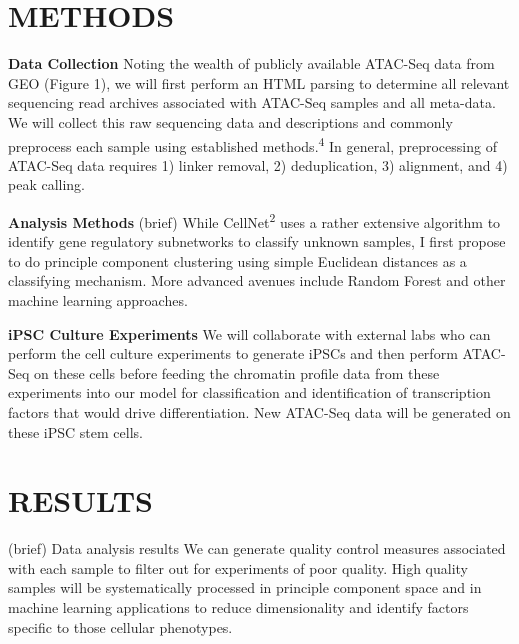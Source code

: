 \documentclass[12pt]{article}
\begin{document}
 \section{\textbf{{\Large M}{\small ETHODS}}}
 
\textbf{Data Collection} \newline
 Noting the wealth of publicly available ATAC-Seq data from GEO (Figure 1), we will first perform an HTML parsing to determine all relevant sequencing read archives associated with ATAC-Seq samples and all meta-data. We will collect this raw sequencing data and descriptions and commonly preprocess each sample using established methods.\textsuperscript{4} In general, preprocessing of ATAC-Seq data requires 1) linker removal, 2) deduplication, 3) alignment, and 4) peak calling.  \newline

\textbf{Analysis Methods} \newline
(brief) While CellNet\textsuperscript{2} uses a rather extensive algorithm to identify gene regulatory subnetworks to classify unknown samples, I first propose to do principle component clustering using simple Euclidean distances as a classifying mechanism. More advanced avenues include Random Forest and other machine learning approaches. \newline 

\textbf{iPSC Culture Experiments} \newline
We will collaborate with external labs who can perform the cell culture experiments to generate iPSCs and then perform ATAC-Seq on these cells before feeding the chromatin profile data from these experiments into our model for classification and identification of transcription factors that would drive differentiation. New ATAC-Seq data will be generated on these iPSC stem cells. 

 \section{\textbf{{\Large R}{\small ESULTS}}}
(brief) Data analysis results \newline
We can generate quality control measures associated with each sample to filter out for experiments of poor quality. High quality samples will be systematically processed in principle component space and in machine learning applications to reduce dimensionality and identify factors specific to those cellular phenotypes.  \newline
\end{document}
